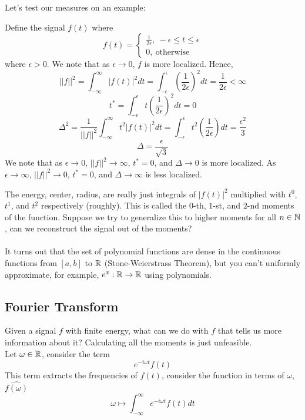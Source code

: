 \documentclass{article}
\begin{document}
Let's test our measures on an example:

\begin{example}
    Define the signal $f(t)$ where
    \[f(t) = \begin{cases}
        \frac{1}{2\epsilon},\ -\epsilon \leq t \leq \epsilon\\
        0,\ \text{otherwise}
    \end{cases}\]
    where $\epsilon > 0$. We note that as $\epsilon \to 0$, $f$ is more localized. Hence,
    \[||f||^2 = \int_{-\infty}^{\infty} |f(t)|^2 dt = \int_{-\epsilon}^\epsilon (\frac{1}{2\epsilon})^2 dt = \frac{1}{2\epsilon} < \infty\]
    \[t^* = \int_{-\epsilon}^\epsilon t(\frac{1}{2\epsilon})^2 dt = 0\]
    \[\Delta^2 = \frac{1}{||f||^2} \int_{-\infty}^\infty t^2 |f(t)|^2 dt = \int_{-\epsilon}^\epsilon t^2 (\frac{1}{2\epsilon}) dt = \frac{\epsilon^2}{3}\]
    \[\Delta = \frac{\epsilon}{\sqrt{3}}\]
    We note that as $\epsilon \to 0$, $||f||^2 \to \infty$, $t^* = 0$, and $\Delta \to 0$ is more localized. As $\epsilon \to \infty$, $||f||^2 \to 0$, $t^* = 0$, and $\Delta \to \infty$ is less localized.
\end{example}

\begin{remark}
    The energy, center, radius, are really just integrals of $|f(t)|^2$ multiplied with $t^0$, $t^1$, and $t^2$ respectively (roughly). This is called the $0$-th, $1$-st, and $2$-nd moments of the function. Suppose we try to generalize this to higher moments for all $n \in \mathbb{N}$, can we reconstruct the signal out of the moments?\\\\
    It turns out that the set of polynomial functions are dense in the continuous functions from $[a, b]$ to $\mathbb{R}$ (Stone-Weierstrass Theorem), but you can't uniformly approximate, for example, $e^x: \mathbb{R} \to \mathbb{R}$ using polynomials.
\end{remark}

\subsection{Fourier Transform}

Given a signal $f$ with finite energy, what can we do with $f$ that tells us more information about it? Calculating all the moments is just unfeasible.\\

Let $\omega \in \mathbb{R}$, consider the term
\[e^{-i\omega t} f(t)\]
This term extracts the frequencies of $f(t)$, consider the function in terms of $\omega$, $\hat{f(\omega)}$
\[\omega \mapsto \int_{-\infty}^\infty e^{-i\omega t} f(t) dt\]
\end{document}
